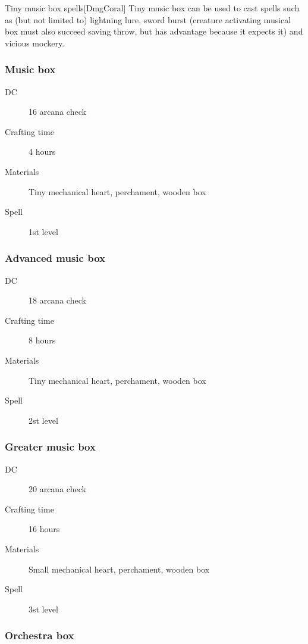 \begin{commentbox}{Tiny music box spells}[DmgCoral]
Tiny music box can be used to cast spells such as (but not limited to) lightning lure, sword burst (creature activating musical box must also succeed saving throw, but has advantage because it expects it) and vicious mockery. 
\end{commentbox}

\subsubsection{Music box}

\begin{description}
\item [DC] 16 arcana check
\item [Crafting time] 4 hours
\item [Materials] Tiny mechanical heart, perchament, wooden box
\item [Spell] 1st level
\end{description}

\subsubsection{Advanced music box}

\begin{description}
\item [DC] 18 arcana check
\item [Crafting time] 8 hours
\item [Materials] Tiny mechanical heart, perchament, wooden box
\item [Spell] 2st level
\end{description}

\subsubsection{Greater music box}

\begin{description}
\item [DC] 20 arcana check
\item [Crafting time] 16 hours
\item [Materials] Small mechanical heart, perchament, wooden box
\item [Spell] 3st level
\end{description}

\subsubsection{Orchestra box}

